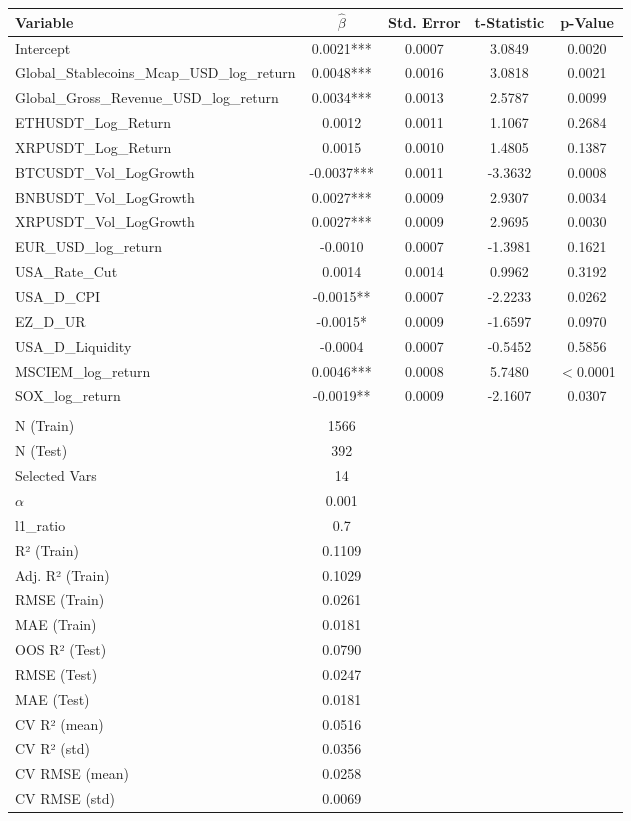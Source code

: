 \begin{tabular}{lcccc}
  \toprule
  \textbf{Variable} & \textbf{$\hat{\beta}$} & \textbf{Std. Error} & \textbf{t-Statistic} & \textbf{p-Value} \\ 
  \midrule
  Intercept & 0.0021*** & 0.0007 & 3.0849 & 0.0020 \\ 
  Global\_Stablecoins\_Mcap\_USD\_log\_return & 0.0048*** & 0.0016 & 3.0818 & 0.0021 \\ 
  Global\_Gross\_Revenue\_USD\_log\_return & 0.0034*** & 0.0013 & 2.5787 & 0.0099 \\ 
  ETHUSDT\_Log\_Return & 0.0012 & 0.0011 & 1.1067 & 0.2684 \\ 
  XRPUSDT\_Log\_Return & 0.0015 & 0.0010 & 1.4805 & 0.1387 \\ 
  BTCUSDT\_Vol\_LogGrowth & -0.0037*** & 0.0011 & -3.3632 & 0.0008 \\ 
  BNBUSDT\_Vol\_LogGrowth & 0.0027*** & 0.0009 & 2.9307 & 0.0034 \\ 
  XRPUSDT\_Vol\_LogGrowth & 0.0027*** & 0.0009 & 2.9695 & 0.0030 \\ 
  EUR\_USD\_log\_return & -0.0010 & 0.0007 & -1.3981 & 0.1621 \\ 
  USA\_Rate\_Cut & 0.0014 & 0.0014 & 0.9962 & 0.3192 \\ 
  USA\_D\_CPI & -0.0015** & 0.0007 & -2.2233 & 0.0262 \\ 
  EZ\_D\_UR & -0.0015* & 0.0009 & -1.6597 & 0.0970 \\ 
  USA\_D\_Liquidity & -0.0004 & 0.0007 & -0.5452 & 0.5856 \\ 
  MSCIEM\_log\_return & 0.0046*** & 0.0008 & 5.7480 & $<$0.0001 \\ 
  SOX\_log\_return & -0.0019** & 0.0009 & -2.1607 & 0.0307 \\ 
   &  &  &  &  \\ 
  N (Train) & 1566 &  &  &  \\ 
  N (Test) & 392 &  &  &  \\ 
  Selected Vars & 14 &  &  &  \\ 
  $\alpha$ & 0.001 &  &  &  \\ 
  l1\_ratio & 0.7 &  &  &  \\ 
  R² (Train) & 0.1109 &  &  &  \\ 
  Adj. R² (Train) & 0.1029 &  &  &  \\ 
  RMSE (Train) & 0.0261 &  &  &  \\ 
  MAE (Train) & 0.0181 &  &  &  \\ 
  OOS R² (Test) & 0.0790 &  &  &  \\ 
  RMSE (Test) & 0.0247 &  &  &  \\ 
  MAE (Test) & 0.0181 &  &  &  \\ 
  CV R² (mean) & 0.0516 &  &  &  \\ 
  CV R² (std) & 0.0356 &  &  &  \\ 
  CV RMSE (mean) & 0.0258 &  &  &  \\ 
  CV RMSE (std) & 0.0069 &  &  &  \\ 
  \bottomrule
\end{tabular}
